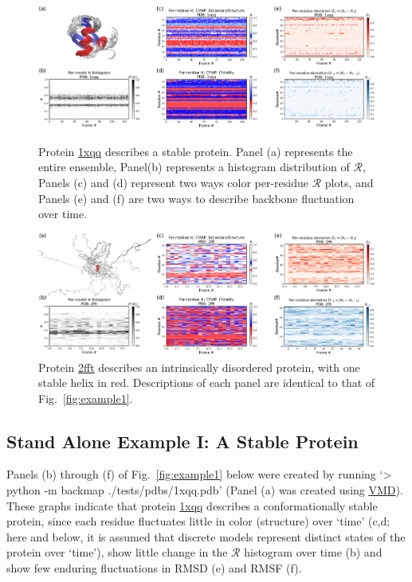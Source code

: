 \documentclass[fleqn,10pt,lineno]{wlpeerj} %
\newcommand{\Fig}[1]{Fig.~\ref{#1}}
\newcommand{\n}[1]{{\color{red}#1}}
\newcommand{\rr}{$\mathcal{R}$\xspace}
\begin{document}
\begin{figure}[t!]
\includegraphics[width=1.0\linewidth]{figures/1xqq_spread.pdf}
\caption{Protein \href{https://www.rcsb.org/structure/1XQQ}{1xqq} describes a stable protein. \n{Panel (a) represents the entire ensemble, Panel(b) represents a histogram distribution of \rr, Panels (c) and (d) represent two ways color per-residue \rr plots, and Panels (e) and (f) are two ways to describe backbone fluctuation over time.}\label{fig:example1}} 
\includegraphics[width=1.0\linewidth]{figures/2fft_spread.pdf}
\caption{Protein \href{https://www.rcsb.org/structure/2FFT}{2fft} describes an intrinsically disordered protein, with one stable helix in red.
\n{Descriptions of each panel are identical to that of \Fig{fig:example1}.}\label{fig:example2}} 
\end{figure}

\subsection*{Stand Alone Example I: A Stable Protein}

Panels (b) through (f) of \Fig{fig:example1} below were created by running `> python -m backmap ./tests/pdbs/1xqq.pdb' (Panel (a) was created using \href{http://www.ks.uiuc.edu/Research/vmd/}{VMD}). These graphs indicate that protein \href{https://www.rcsb.org/structure/1XQQ}{1xqq} describes a conformationally stable protein, since each residue fluctuates little in color (structure) over `time' (c,d; here and below, it is assumed that discrete models represent distinct states of the protein over `time'), show little change in the \rr histogram over time (b) and show few enduring fluctuations in RMSD (e) and RMSF (f). 
\end{document}
